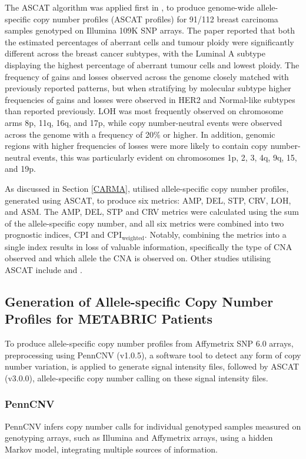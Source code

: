 The ASCAT algorithm was applied first in \cite{pmid20837533}, to produce genome-wide allele-specific copy number profiles (ASCAT profiles) for 91/112 breast carcinoma samples genotyped on Illumina 109K SNP arrays. The paper reported that both the estimated percentages of aberrant cells and tumour ploidy were significantly different across the breast cancer subtypes, with the Luminal A subtype displaying the highest percentage of aberrant tumour cells and lowest ploidy. The frequency of gains and losses observed across the genome closely matched with previously reported patterns, but when stratifying by molecular subtype higher frequencies of gains and losses were observed in HER2 and Normal-like subtypes than reported previously. LOH was most frequently observed on chromosome arms 8p, 11q, 16q, and 17p, while copy number-neutral events were observed across the genome with a frequency of 20\% or higher. In addition, genomic regions with higher frequencies of losses were more likely to contain copy number-neutral events, this was particularly evident on chromosomes 1p, 2, 3, 4q, 9q, 15, and 19p.

As discussed in Section \ref{CARMA}, \cite{pmid32242091} utilised allele-specific copy number profiles, generated using ASCAT, to produce six metrics: AMP, DEL, STP, CRV, LOH, and ASM. The AMP, DEL, STP and CRV metrics were calculated using the sum of the allele-specific copy number, and all six metrics were combined into two prognostic indices, CPI and $\text{CPI}_\text{weighted}$. Notably, combining the metrics into a single index results in loss of valuable information, specifically the type of CNA observed and which allele the CNA is observed on. Other studies utilising ASCAT include \cite{pmid26205786, pmid27161491, pmid35705804, pmid36806386} and \cite{pmid36944408}. 

\subsection{Generation of Allele-specific Copy Number Profiles for METABRIC Patients}
To produce allele-specific copy number profiles from Affymetrix SNP 6.0 arrays, preprocessing using PennCNV (v1.0.5), a software tool to detect any form of copy number variation, is applied to generate signal intensity files, followed by ASCAT (v3.0.0), allele-specific copy number calling on these signal intensity files.

\subsubsection{PennCNV}
PennCNV \citep{pmid17921354} infers copy number calls for individual genotyped samples measured on genotyping arrays, such as Illumina and Affymetrix arrays, using a hidden Markov model, integrating multiple sources of information. 

